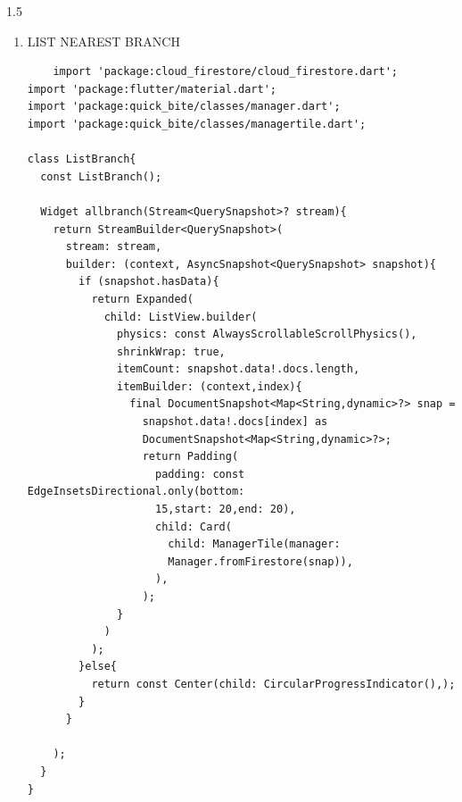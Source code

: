 \begin{spacing}{1.5}
\begin{enumerate}
\item LIST NEAREST BRANCH
\begin{verbatim}
    import 'package:cloud_firestore/cloud_firestore.dart';
import 'package:flutter/material.dart';
import 'package:quick_bite/classes/manager.dart';
import 'package:quick_bite/classes/managertile.dart';

class ListBranch{
  const ListBranch();

  Widget allbranch(Stream<QuerySnapshot>? stream){
    return StreamBuilder<QuerySnapshot>(
      stream: stream, 
      builder: (context, AsyncSnapshot<QuerySnapshot> snapshot){
        if (snapshot.hasData){
          return Expanded(
            child: ListView.builder(
              physics: const AlwaysScrollableScrollPhysics(),
              shrinkWrap: true,
              itemCount: snapshot.data!.docs.length,
              itemBuilder: (context,index){
                final DocumentSnapshot<Map<String,dynamic>?> snap =
                  snapshot.data!.docs[index] as 
                  DocumentSnapshot<Map<String,dynamic>?>;
                  return Padding(
                    padding: const EdgeInsetsDirectional.only(bottom:
                    15,start: 20,end: 20),
                    child: Card(
                      child: ManagerTile(manager: 
                      Manager.fromFirestore(snap)),
                    ),
                  );
              }
            )
          );
        }else{
          return const Center(child: CircularProgressIndicator(),);
        }
      }
      
    );
  }
}
\end{verbatim}

\end{enumerate}

\end{spacing}
